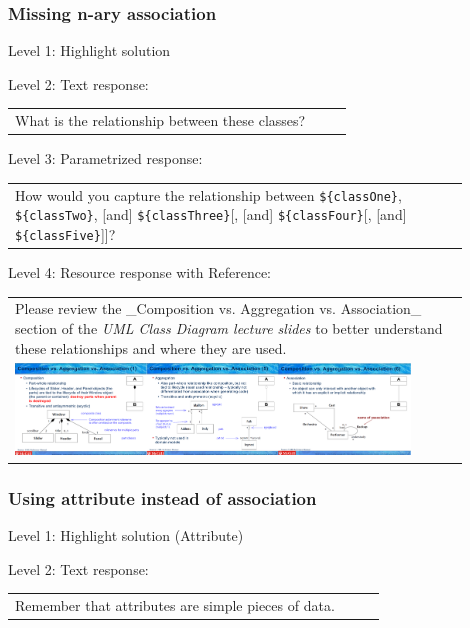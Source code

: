 \subsubsection{Missing n-ary association}

\noindent Level 1: Highlight solution  \medskip

\noindent Level 2: Text response: \medskip

\begin{tabular}{|p{0.9\linewidth}}
What is the relationship between these classes?
\end{tabular} \medskip

\noindent Level 3: Parametrized response: \medskip

\begin{tabular}{|p{0.9\linewidth}}
How would you capture the relationship between \verb|${classOne}|, \verb|${classTwo}|, [and] \verb|${classThree}|[, [and] \verb|${classFour}|[, [and] \verb|${classFive}|]]?
\end{tabular} \medskip

\noindent Level 4: Resource response with Reference: \medskip

\begin{tabular}{|p{0.9\linewidth}}
Please review the _Composition vs. Aggregation vs. Association_ section of 
the \textit{UML Class Diagram lecture slides} to 
better understand these relationships and where they are used.

\\
\includegraphics[width=0.9\textwidth]{images/composition_aggregation_association.png}
\end{tabular} \medskip


\subsubsection{Using attribute instead of association}

\noindent Level 1: Highlight solution (Attribute) \medskip

\noindent Level 2: Text response: \medskip

\begin{tabular}{|p{0.9\linewidth}}
Remember that attributes are simple pieces of data.
\end{tabular} \medskip


